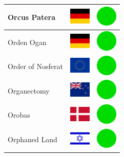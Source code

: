 \documentclass[12pt, a4paper, twoside]{report}
\begin{document}
\begin{center}
\begin{longtable}{|p{5cm}|p{2cm}|p{2cm}|}
 Orcus Patera                                               & \includegraphics[width=1cm]{../img/flags/de} &   \includegraphics[width=1cm]{../likes/y} \\ \hline
 Orden Ogan                                                 & \includegraphics[width=1cm]{../img/flags/de} &   \includegraphics[width=1cm]{../likes/y} \\ \hline
 Order of Nosferat                                          & \includegraphics[width=1cm]{../img/flags/eu} &   \includegraphics[width=1cm]{../likes/y} \\ \hline
 Organectomy                                                & \includegraphics[width=1cm]{../img/flags/nz} &   \includegraphics[width=1cm]{../likes/y} \\ \hline
 Orobas                                                     & \includegraphics[width=1cm]{../img/flags/dk} &   \includegraphics[width=1cm]{../likes/y} \\ \hline
 Orphaned Land                                              & \includegraphics[width=1cm]{../img/flags/il} &   \includegraphics[width=1cm]{../likes/y} \\ \hline

\end{longtable}
\end{center}
\end{document}
